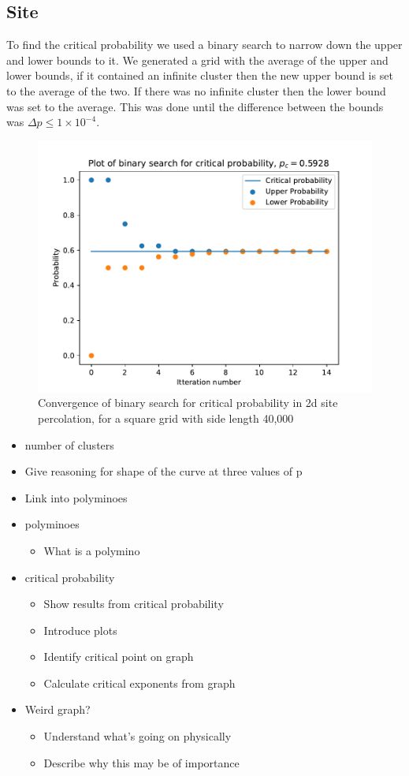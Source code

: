 \documentclass[%
 reprint,
 amsmath,amssymb,
 aps,
]{revtex4-2}
\begin{document}
\subsection{Site}
To find the critical probability we used a binary search to narrow down the upper and lower bounds to it. We generated a grid with the average of the upper and lower bounds, if it contained an infinite cluster then the new upper bound is set to the average of the two. If there was no infinite cluster then the lower bound was set to the average. This was done until the difference between the bounds was $\Delta p \leq 1\times 10^{-4}$.
\begin{figure}[H]
    \centering
    \includegraphics[width=\linewidth]{report/assets/critical_prob.pdf}
    \caption{Convergence of binary search for critical probability in 2d site percolation, for a square grid with side length 40,000}
\end{figure}
\begin{itemize}
\item number of clusters
\item Give reasoning for shape of the curve at three values of p
\item Link into polyminoes
\item polyminoes
\begin{itemize}
\item What is a polymino
\end{itemize}
\item critical probability
\begin{itemize}
\item Show results from critical probability 
\item  Introduce plots
\item  Identify critical point on graph
\item Calculate critical exponents from graph
\end{itemize}
\item  Weird graph?
\begin{itemize}
\item Understand what's going on physically
\item Describe why this may be of importance
\end{itemize}
\end{itemize}
\end{document}
